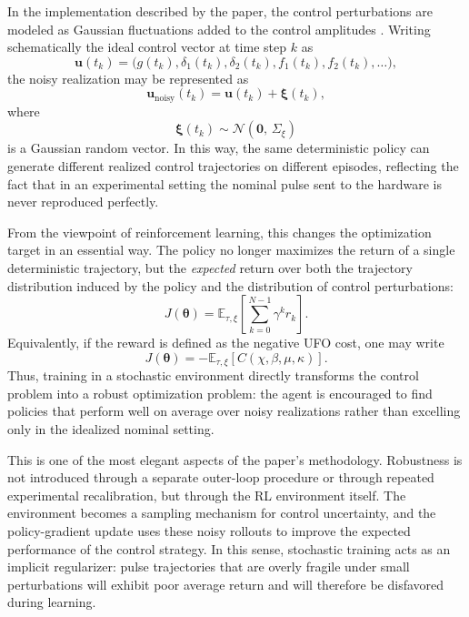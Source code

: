 In the implementation described by the paper, the control perturbations are modeled as Gaussian fluctuations added to the control amplitudes \cite{Niu2019}. Writing schematically the ideal control vector at time step \(k\) as
\begin{equation}
\bm{u}(t_k)
=
\bigl(
g(t_k),\delta_1(t_k),\delta_2(t_k),f_1(t_k),f_2(t_k),\dots
\bigr),
\label{eq:ideal_control_vector_noise_section}
\end{equation}
the noisy realization may be represented as
\begin{equation}
\bm{u}_{\mathrm{noisy}}(t_k)
=
\bm{u}(t_k)
+
\bm{\xi}(t_k),
\label{eq:noisy_control_vector}
\end{equation}
where
\begin{equation}
\bm{\xi}(t_k)
\sim
\mathcal{N}\!\left(\bm{0},\,\Sigma_{\xi}\right)
\label{eq:gaussian_control_noise}
\end{equation}
is a Gaussian random vector. In this way, the same deterministic policy can generate different realized control trajectories on different episodes, reflecting the fact that in an experimental setting the nominal pulse sent to the hardware is never reproduced perfectly.

From the viewpoint of reinforcement learning, this changes the optimization target in an essential way. The policy no longer maximizes the return of a single deterministic trajectory, but the \emph{expected} return over both the trajectory distribution induced by the policy and the distribution of control perturbations:
\begin{equation}
J(\bm{\theta})
=
\mathbb{E}_{\tau,\xi}
\left[
\sum_{k=0}^{N-1}\gamma^k r_k
\right].
\label{eq:expected_return_under_noise}
\end{equation}
Equivalently, if the reward is defined as the negative UFO cost, one may write
\begin{equation}
J(\bm{\theta})
=
-
\mathbb{E}_{\tau,\xi}
\left[
C(\chi,\beta,\mu,\kappa)
\right].
\label{eq:expected_ufo_cost_under_noise}
\end{equation}
Thus, training in a stochastic environment directly transforms the control problem into a robust optimization problem: the agent is encouraged to find policies that perform well on average over noisy realizations rather than excelling only in the idealized nominal setting.

This is one of the most elegant aspects of the paper's methodology. Robustness is not introduced through a separate outer-loop procedure or through repeated experimental recalibration, but through the RL environment itself. The environment becomes a sampling mechanism for control uncertainty, and the policy-gradient update uses these noisy rollouts to improve the expected performance of the control strategy. In this sense, stochastic training acts as an implicit regularizer: pulse trajectories that are overly fragile under small perturbations will exhibit poor average return and will therefore be disfavored during learning.

